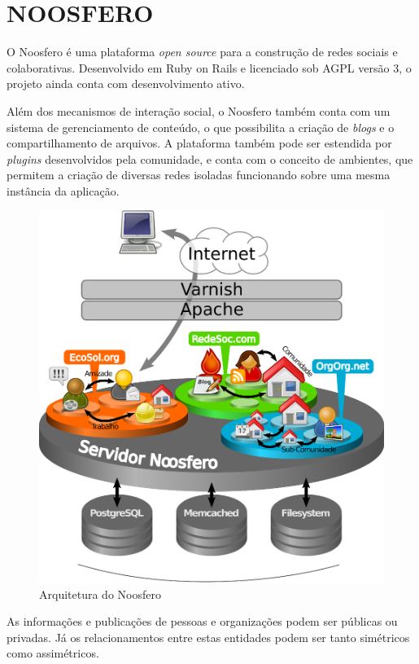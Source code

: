 \chapter{NOOSFERO}

O Noosfero é uma plataforma \textit{open source} para a construção de redes sociais
e colaborativas. Desenvolvido em Ruby on Rails e licenciado sob AGPL versão 3, o
projeto ainda conta com desenvolvimento ativo.

Além dos mecanismos de interação social, o Noosfero também conta com um sistema de
gerenciamento de conteúdo, o que possibilita a criação de \textit{blogs} e o
compartilhamento de arquivos. A plataforma também pode ser estendida por
\textit{plugins} desenvolvidos pela comunidade, e conta com o conceito de ambientes,
que permitem a criação de diversas redes isoladas funcionando sobre uma mesma
instância da aplicação.

\begin{figure}[h]
	\centering
		\includegraphics[keepaspectratio=true,scale=0.4]{figuras/noosfero_estrutura.eps}
	\caption{Arquitetura do Noosfero}
	\label{fig:noosferoEstrutura}
\end{figure}

As informações e publicações de pessoas e organizações podem ser públicas ou
privadas. Já os relacionamentos entre estas entidades podem ser tanto simétricos
como assimétricos.

